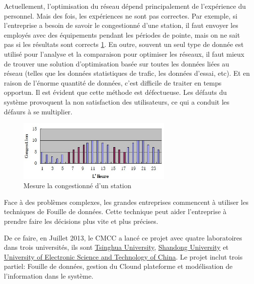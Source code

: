 Actuellement, l'optimisation du réseau dépend principalement de l'expérience du personnel. Mais des fois, les expériences ne sont pas correctes. Par exemple, si l'entreprise a besoin de savoir le congestionné d'une station, il faut envoyer les employés avec des équipements pendant les périodes de pointe, mais on ne sait pas si les résultats sont corrects \ref{meseau}.  En outre, souvent un seul type de donnée est utilisé pour l'analyse et la comparaison pour optimiser les réseaux, il faut mieux de trouver une solution d'optimisation basée sur toutes les données liées au réseau (telles que les données statistiques de trafic, les données d'essai, etc). Et en raison de l'énorme quantité de données, c'est difficile de traiter en temps opportun. Il est évident que cette méthode est défectueuse. Les défauts du système provoquent la non satisfaction des utilisateurs, ce qui a conduit les défaurs à se multiplier.
      \begin{figure}[H]
          \centering
          \includegraphics[width=3in]{images/meseau.jpg}
          \caption{Mesure la congestionné d'un station}
          \label{meseau}
      \end{figure}
      
Face à des problèmes complexes, les grandes entreprises commencent à utiliser les techniques de Fouille de données. Cette technique peut aider l'entreprise à prendre faire les décisions plus vite et plus précises.

De ce faire, en Juillet 2013, le CMCC a lancé ce projet avec quatre laboratoires dans trois universités, ils sont
 \href{http://www.tsinghua.edu.cn/publish/newthuen/index.html}{Tsinghua University}, \href{http://en.sdu.edu.cn/}{Shandong University} et \href{http://www.oice.uestc.edu.cn/en/}{University of Electronic Science and Technology of China}. Le projet inclut trois partiel: Fouille de données, gestion du Clound plateforme et modélisation de l'information dans le système.
 

